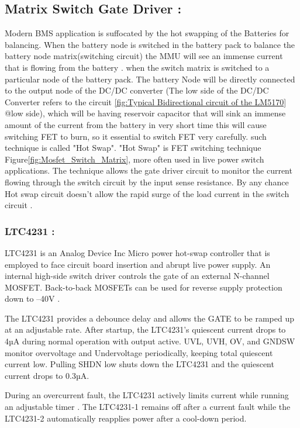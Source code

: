 \subsection{Matrix Switch Gate Driver :}
Modern BMS application is suffocated by the hot swapping of the Batteries for balancing. When the battery node is switched in the battery pack to balance the battery node matrix(switching circuit) the MMU will see an immense current that is flowing from the battery \cite{LTC4231_User_Datasheet}. when the switch matrix is switched to a particular node of the battery pack. The battery Node will be directly connected to the output node of the DC/DC converter (The low side of the DC/DC Converter refers to the circuit \ref{fig:Typical Bidirectional circuit of the LM5170} @low side), which will be having reservoir capacitor that will sink an immense amount of the current from the battery in very short time this will cause switching FET to burn, so it essential to switch FET very carefully. such technique is called "Hot Swap". "Hot Swap" is FET switching technique Figure\ref{fig:Mosfet_Switch_Matrix}, more often used in live power switch applications. The technique allows the gate driver circuit to monitor the current flowing through the switch circuit by the input sense resistance. By any chance Hot swap circuit doesn't allow the rapid surge of the load current in the switch circuit \cite{LTC4231_User_Datasheet}.
\subsubsection{LTC4231 :}
LTC4231 is an Analog Device Inc Micro power hot-swap controller that is employed to face circuit board insertion and abrupt live power supply. An internal high-side switch driver controls the gate of an external N-channel MOSFET. Back-to-back MOSFETs can be used for reverse supply protection down to –40V \cite{LTC4231_User_Datasheet}.

The LTC4231 provides a debounce delay and allows the GATE to be ramped up at an adjustable rate. After startup, the LTC4231's quiescent current drops to 4µA during normal operation with output active. UVL, UVH, OV, and GNDSW monitor overvoltage and Undervoltage periodically, keeping total quiescent current low. Pulling SHDN low shuts down the LTC4231 and the quiescent current drops to 0.3µA.

During an overcurrent fault, the LTC4231 actively limits current while running an adjustable timer \cite{LTC4231_User_Datasheet}. The LTC4231-1 remains off after a current fault while the LTC4231-2 automatically reapplies power after a cool-down period\cite{LTC4231_User_Datasheet}.

